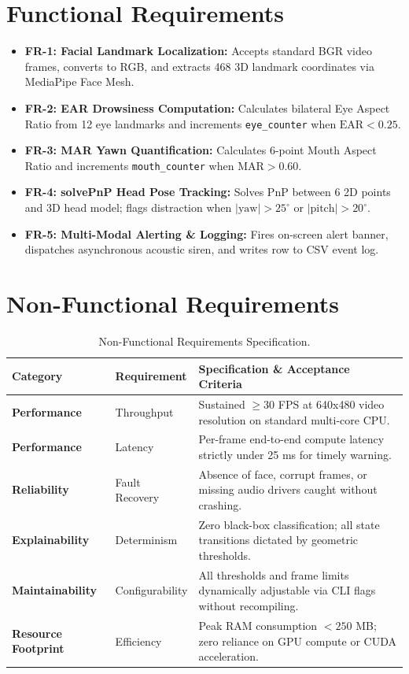 \documentclass[11pt,a4paper]{article}
\begin{document}
\section{Functional Requirements}
\begin{itemize}
    \item \textbf{FR-1: Facial Landmark Localization:} Accepts standard BGR video frames, converts to RGB, and extracts 468 3D landmark coordinates via MediaPipe Face Mesh.
    \item \textbf{FR-2: EAR Drowsiness Computation:} Calculates bilateral Eye Aspect Ratio from 12 eye landmarks and increments \texttt{eye\_counter} when $\text{EAR} < 0.25$.
    \item \textbf{FR-3: MAR Yawn Quantification:} Calculates 6-point Mouth Aspect Ratio and increments \texttt{mouth\_counter} when $\text{MAR} > 0.60$.
    \item \textbf{FR-4: solvePnP Head Pose Tracking:} Solves PnP between 6 2D points and 3D head model; flags distraction when $|\text{yaw}| > 25^\circ$ or $|\text{pitch}| > 20^\circ$.
    \item \textbf{FR-5: Multi-Modal Alerting \& Logging:} Fires on-screen alert banner, dispatches asynchronous acoustic siren, and writes row to CSV event log.
\end{itemize}

\section{Non-Functional Requirements}
\begin{table}[h!]
\centering\small
\begin{tabular}{llp{9cm}}
\toprule
\textbf{Category} & \textbf{Requirement} & \textbf{Specification \& Acceptance Criteria} \\
\midrule
\textbf{Performance} & Throughput & Sustained $\ge 30$ FPS at 640x480 video resolution on standard multi-core CPU. \\
\textbf{Performance} & Latency & Per-frame end-to-end compute latency strictly under 25 ms for timely warning. \\
\textbf{Reliability} & Fault Recovery & Absence of face, corrupt frames, or missing audio drivers caught without crashing. \\
\textbf{Explainability} & Determinism & Zero black-box classification; all state transitions dictated by geometric thresholds. \\
\textbf{Maintainability} & Configurability & All thresholds and frame limits dynamically adjustable via CLI flags without recompiling. \\
\textbf{Resource Footprint} & Efficiency & Peak RAM consumption $< 250$ MB; zero reliance on GPU compute or CUDA acceleration. \\
\bottomrule
\end{tabular}
\caption{Non-Functional Requirements Specification.}
\end{table}
\end{document}
